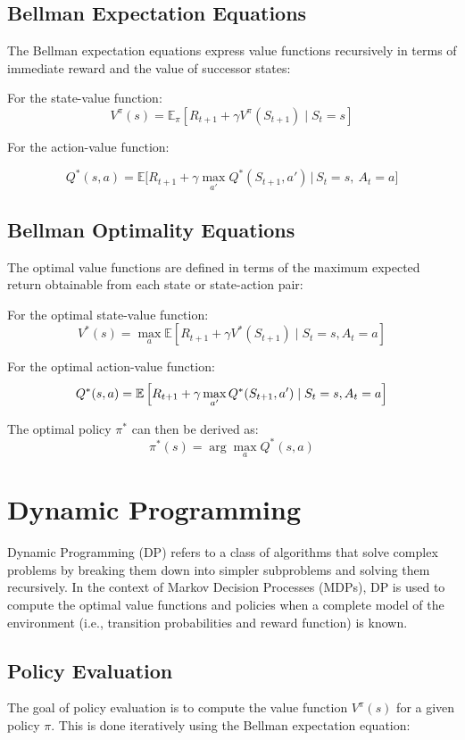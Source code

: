 \documentclass[10pt,twocolumn,letterpaper]{article}
\begin{document}
\subsection*{Bellman Expectation Equations}

The Bellman expectation equations express value functions recursively in terms of immediate reward and the value of successor states:

For the state-value function:
\[
V^\pi(s) = \mathbb{E}_\pi \left[ R_{t+1} + \gamma V^\pi(S_{t+1}) \mid S_t = s \right]
\]

For the action-value function:
\begin{adjustwidth}{-1cm}{0cm}
$$
Q^*(s, a) = \mathbb{E} \big[ R_{t+1} + \gamma \max_{a'} Q^*(S_{t+1}, a') \,\big|\, S_t = s,\ A_t = a \big]
$$
\end{adjustwidth}

\subsection*{Bellman Optimality Equations}

The optimal value functions are defined in terms of the maximum expected return obtainable from each state or state-action pair:

For the optimal state-value function:
\[
V^*(s) = \max_a \mathbb{E} \left[ R_{t+1} + \gamma V^*(S_{t+1}) \mid S_t = s, A_t = a \right]
\]

For the optimal action-value function:
\[
Q^*(s, a) = \mathbb{E} \left[ R_{t+1} + \gamma \max_{a'} Q^*(S_{t+1}, a') 
\\
\mid S_t = s, A_t = a \right]
\]

The optimal policy $\pi^*$ can then be derived as:
\[
\pi^*(s) = \arg\max_a Q^*(s, a)
\]

\section{Dynamic Programming}

Dynamic Programming (DP) refers to a class of algorithms that solve complex problems by breaking them down into simpler subproblems and solving them recursively. In the context of Markov Decision Processes (MDPs), DP is used to compute the optimal value functions and policies when a complete model of the environment (i.e., transition probabilities and reward function) is known.

\subsection*{Policy Evaluation}
The goal of policy evaluation is to compute the value function $V^\pi(s)$ for a given policy $\pi$. This is done iteratively using the Bellman expectation equation:
\end{document}
